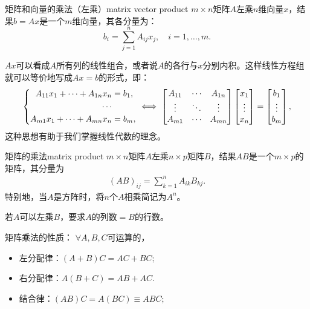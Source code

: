 \begin{definition}
	{矩阵和向量的乘法（左乘）}{matrix vector product}
	$m\times n$矩阵$A$左乘$n$维向量$x$，结果$b=Ax$是一个$m$维向量，其各分量为：
	\begin{equation}
		b_i=\sum_{j=1}^nA_{ij}x_j,\quad i=1,\ldots,m.
	\end{equation}
\end{definition}

\begin{remark}
	$Ax$可以看成$A$所有列的线性组合，或者说$A$的各行与$x$分别内积。这样线性方程组就可以等价地写成$Ax=b$的形式，即：
	\[
		\left\{\begin{aligned}
	        A_{11}x_1+\cdots+A_{1n}x_n&=b_1,\\
	        \cdots&\\
	        A_{m1}x_1+\cdots+A_{mn}x_n&=b_m,
	    \end{aligned}\right.\iff
	    \begin{bmatrix}
	        A_{11}&\cdots&A_{1n}\\
	        \vdots&\ddots&\vdots\\
	        A_{m1}&\cdots&A_{mn}
	    \end{bmatrix}
	    \begin{bmatrix}
	        x_1\\\vdots\\x_n
	    \end{bmatrix}=
	    \begin{bmatrix}
	        b_1\\\vdots\\b_m
	    \end{bmatrix},
	\]
	这种思想有助于我们掌握线性代数的理念。
\end{remark}

\begin{definition}{矩阵的乘法}{matrix product}
	$m\times n$矩阵$A$左乘$n\times p$矩阵$B$，结果$AB$是一个$m\times p$的矩阵，其分量为
	\begin{align}
		(AB)_{ij}=\sum_{k=1}^nA_{ik}B_{kj}.
	\end{align}
	特别地，当$A$是方阵时，将$n$个$A$相乘简记为$A^n$。
\end{definition}

\begin{remark}
	若$A$可以左乘$B$，要求$A$的列数$=B$的行数。
\end{remark}

\begin{corollary}
	矩阵乘法的性质：%
	$\forall A,B,C$可运算的，
    \begin{itemize}
    	\item 左分配律：$(A+B)C=AC+BC;$
    	\item 右分配律：$A(B+C)=AB+AC.$
        \item 结合律：$(AB)C=A(BC)\equiv ABC;$
    \end{itemize}
\end{corollary}

